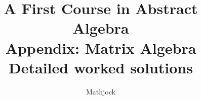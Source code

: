 
\title{\textbf{A First Course in Abstract Algebra}\\[0.3em]Appendix: Matrix Algebra\\[0.3em]\large Detailed worked solutions}
\author{Mathjock}
\date{}

\maketitle
\bookinfo
\tableofcontents
\clearpage
\renewcommand{\thesection}{A}
\renewcommand{\theHsection}{fraleigh.A}


